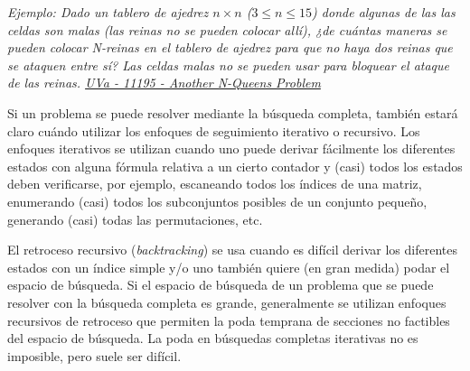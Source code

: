 \emph{Ejemplo: Dado un tablero de ajedrez $n \times n$ ($3 \le n \le 15$) donde algunas de las las celdas son malas (las reinas no se pueden colocar allí), ¿de cuántas maneras se pueden colocar N-reinas en el tablero de ajedrez para que no haya dos reinas que se ataquen entre sí? Las celdas malas no se pueden usar para bloquear el ataque de las reinas. \href{https://onlinejudge.org/index.php?option=onlinejudge&Itemid=8&page=show_problem&problem=2136}{UVa - 11195 - Another N-Queens Problem}}


Si un problema se puede resolver mediante la búsqueda completa, también estará claro cuándo utilizar los enfoques de seguimiento iterativo o recursivo. Los enfoques iterativos se utilizan cuando uno puede derivar fácilmente los diferentes estados con alguna fórmula relativa a un cierto contador y (casi) todos los estados deben verificarse, por ejemplo, escaneando todos los índices de una matriz, enumerando (casi) todos los subconjuntos posibles de un conjunto pequeño, generando (casi) todas las permutaciones, etc. 

El retroceso recursivo (\emph{backtracking}) se usa cuando es difícil derivar los diferentes estados con un índice simple y/o uno también quiere (en gran medida) podar el espacio de búsqueda. Si el espacio de búsqueda de un problema que se puede resolver con la búsqueda completa es grande, generalmente se utilizan enfoques recursivos de retroceso que permiten la poda temprana de secciones no factibles del espacio de búsqueda. La poda en búsquedas completas iterativas no es imposible, pero suele ser difícil.